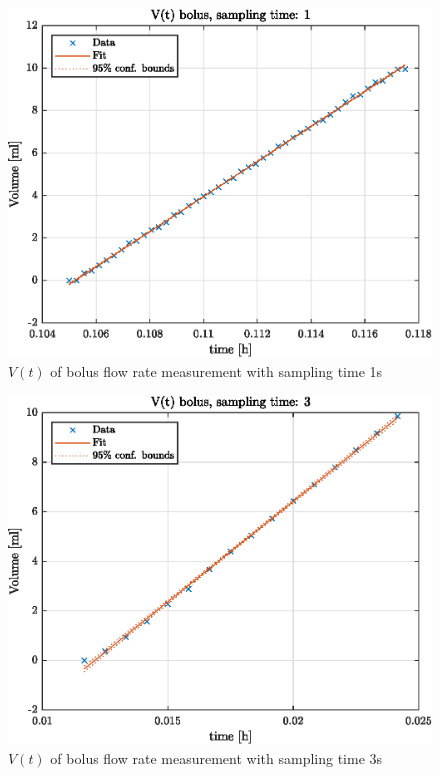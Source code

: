 \documentclass[12pt,a4paper]{article}
\begin{document}
	\newpage
	\begin{figure}[h!]
		\centering
		\includegraphics[width=0.8\linewidth]{figures/V_t__bolus__sampling_time__1.eps}
		\caption{$V(t)$ of bolus flow rate measurement with sampling time 1s}
		\label{fig:v_t_bfr1}
	\end{figure}
	
	\begin{figure}[h!]
		\centering
		\includegraphics[width=0.8\linewidth]{figures/V_t__bolus__sampling_time__3.eps}
		\caption{$V(t)$ of bolus flow rate measurement with sampling time 3s}
		\label{fig:v_t_bfr3}
	\end{figure}
	
\end{document}

